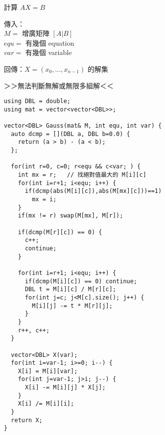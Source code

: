 \begin{description}
    \item 計算 $AX = B$
    \item 傳入： \\
        $M=$ 增廣矩陣 $[A|B]$ \\
        $equ=$ 有幾個 equation \\
        $var=$ 有幾個 variable
    \item 回傳：$X = (x_0,\dots, x_{n-1})$ 的解集
    \item ＞＞無法判斷無解或無限多組解＜＜
\end{description}

\begin{lstlisting}
using DBL = double;
using mat = vector<vector<DBL>>;

vector<DBL> Gauss(mat& M, int equ, int var) {
  auto dcmp = [](DBL a, DBL b=0.0) {
    return (a > b) - (a < b);
  };

  for(int r=0, c=0; r<equ && c<var; ) {
    int mx = r;   // 找絕對值最大的 M[i][c]
    for(int i=r+1; i<equ; i++) {
      if(dcmp(abs(M[i][c]),abs(M[mx][c]))==1)
        mx = i;
    }
    if(mx != r) swap(M[mx], M[r]);

    if(dcmp(M[r][c]) == 0) {
      c++;
      continue;
    }

    for(int i=r+1; i<equ; i++) {
      if(dcmp(M[i][c]) == 0) continue;
      DBL t = M[i][c] / M[r][c];
      for(int j=c; j<M[c].size(); j++) {
        M[i][j] -= t * M[r][j];
      }
    }
    r++, c++;
  }

  vector<DBL> X(var);
  for(int i=var-1; i>=0; i--) {
    X[i] = M[i][var];
    for(int j=var-1; j>i; j--) {
      X[i] -= M[i][j] * X[j];
    }
    X[i] /= M[i][i];
  }
  return X;
}
\end{lstlisting}